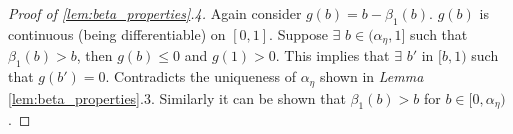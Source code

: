 \documentclass[onecolumn]{IEEEtran}
\begin{document}
 \vspace{2mm}
 \begin{proof}[Proof of \ref{lem:beta_properties}.4]
   Again consider $g(b)=b-\beta_1(b)$. $g(b)$ is continuous (being
   differentiable) on $[0,1]$.  Suppose $\exists$ $b\in(\alpha_\eta,1]$
   such that $\beta_1(b)>b$, then $g(b)\le0$ and $g(1)>0$. This implies that
   $\exists$ $b'$ in $[b,1)$ such that $g(b')=0$. Contradicts the
   uniqueness of $\alpha_\eta$ shown in \emph{Lemma} \ref{lem:beta_properties}.3.  Similarly
   it can be shown that $\beta_1(b)>b$ for $b\in[0,\alpha_\eta)$.
 \end{proof}
\end{document}
